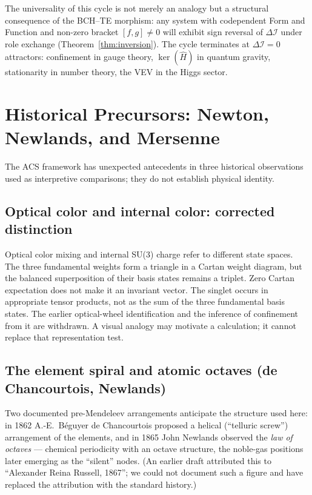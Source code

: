 \documentclass[11pt,a4paper]{article}
\theoremstyle{plain}
\theoremstyle{definition}
\theoremstyle{remark}
\newcommand{\DI}{\Delta\mathcal{I}}
\begin{document}
The universality of this cycle is not merely an analogy but a structural
consequence of the BCH--TE morphism: any system with codependent
Form and Function and non-zero bracket $[f, g] \neq 0$ will exhibit
sign reversal of $\DI$ under role exchange (Theorem~\ref{thm:inversion}).
The cycle terminates at $\DI = 0$ attractors: confinement in gauge
theory, $\ker(\hat{H})$ in quantum gravity, stationarity in number
theory, the VEV in the Higgs sector.

\appendix

\section{Historical Precursors: Newton, Newlands, and Mersenne}
\label{sec:history}

The ACS framework has unexpected antecedents in three historical
observations used as interpretive comparisons; they do not establish physical identity.

\subsection{Optical color and internal color: corrected distinction}
Optical color mixing and internal SU(3) charge refer to different state
spaces. The three fundamental weights form a triangle in a Cartan weight
diagram, but the balanced superposition of their basis states remains a
triplet. Zero Cartan expectation does not make it an invariant vector.
The singlet occurs in appropriate tensor products, not as the sum of the
three fundamental basis states. The earlier optical-wheel identification
and the inference of confinement from it are withdrawn. A visual analogy
may motivate a calculation; it cannot replace that representation test.

\subsection{The element spiral and atomic octaves (de Chancourtois, Newlands)}

Two documented pre-Mendeleev arrangements anticipate the structure used
here: in 1862 A.-E.~B\'eguyer de Chancourtois proposed a helical
(``telluric screw'') arrangement of the elements, and in 1865 John
Newlands observed the \emph{law of octaves} --- chemical periodicity
with an octave structure, the noble-gas positions later emerging as the
``silent'' nodes.  (An earlier draft attributed this to ``Alexander
Reina Russell, 1867''; we could not document such a figure and have
replaced the attribution with the standard history.)
\end{document}
